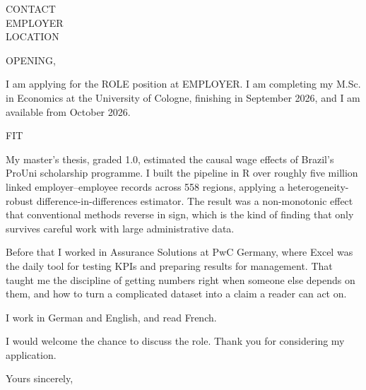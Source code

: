 \documentclass[a4paper,11pt]{letter}
\begin{document}
\begin{letter}{%
    {{CONTACT}} \\
    {{EMPLOYER}} \\
    {{LOCATION}}
}

\opening{{{OPENING}},}

I am applying for the {{ROLE}} position at {{EMPLOYER}}. I am completing my M.Sc. in Economics at the University of Cologne, finishing in September 2026, and I am available from October 2026.

%

{{FIT}}

My master's thesis, graded 1.0, estimated the causal wage effects of Brazil's ProUni scholarship programme. I built the pipeline in R over roughly five million linked employer--employee records across 558 regions, applying a heterogeneity-robust difference-in-differences estimator. The result was a non-monotonic effect that conventional methods reverse in sign, which is the kind of finding that only survives careful work with large administrative data.

Before that I worked in Assurance Solutions at PwC Germany, where Excel was the daily tool for testing KPIs and preparing results for management. That taught me the discipline of getting numbers right when someone else depends on them, and how to turn a complicated dataset into a claim a reader can act on.

I work in German and English, and read French.

I would welcome the chance to discuss the role. Thank you for considering my application.

\closing{Yours sincerely,}

\end{letter}
\end{document}
